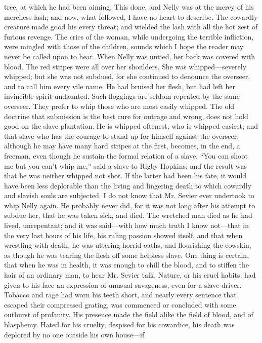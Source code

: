 tree, at which he had been aiming. This done, and Nelly was at the mercy
of his merciless lash; and now, what followed, I have no heart to
describe. The cowardly creature made good his every threat; and wielded
the lash with all the hot zest of furious revenge. The cries of the
woman, while undergoing the terrible infliction, were mingled with those
of the children, sounds which I hope the reader {}may never be called
upon to hear. When Nelly was untied, her back was covered with blood.
The red stripes were all over her shoulders. She was whipped---severely
whipped; but she was not subdued, for she continued to denounce the
overseer, and to call him every vile name. He had bruised her flesh, but
had left her invincible spirit undaunted. Such floggings are seldom
repeated by the same overseer. They prefer to whip those who are most
easily whipped. The old doctrine that submission is the best cure for
outrage and wrong, does not hold good on the slave plantation. He is
whipped oftenest, who is whipped easiest; and that slave who has the
courage to stand up for himself against the overseer, although he may
have many hard stripes at the first, becomes, in the end, a freeman,
even though he sustain the formal relation of a slave. ``You can shoot
me but you can't whip me,'' said a slave to Rigby Hopkins; and the
result was that he was neither whipped not shot. If the latter had been
his fate, it would have been less deplorable than the living and
lingering death to which cowardly and slavish souls are subjected. I do
not know that Mr. Sevier ever undertook to whip Nelly again. He probably
never did, for it was not long after his attempt to subdue her, that he
was taken sick, and died. The wretched man died as he had lived,
unrepentant; and it was said---with how much truth I know not---that in
the very last hours of his life, his ruling passion showed itself, and
that when wrestling with death, he was uttering horrid oaths, and
flourishing the cowskin, as though he was tearing the flesh off some
helpless slave. One thing is {}certain, that when he was in health, it
was enough to chill the blood, and to stiffen the hair of an ordinary
man, to hear Mr. Sevier talk. Nature, or his cruel habits, had given to
his face an expression of unusual savageness, even for a slave-driver.
Tobacco and rage had worn his teeth short, and nearly every sentence
that escaped their compressed grating, was commenced or concluded with
some outburst of profanity. His presence made the field alike the field
of blood, and of blasphemy. Hated for his cruelty, despised for his
cowardice, his death was deplored by no one outside his own house---if
